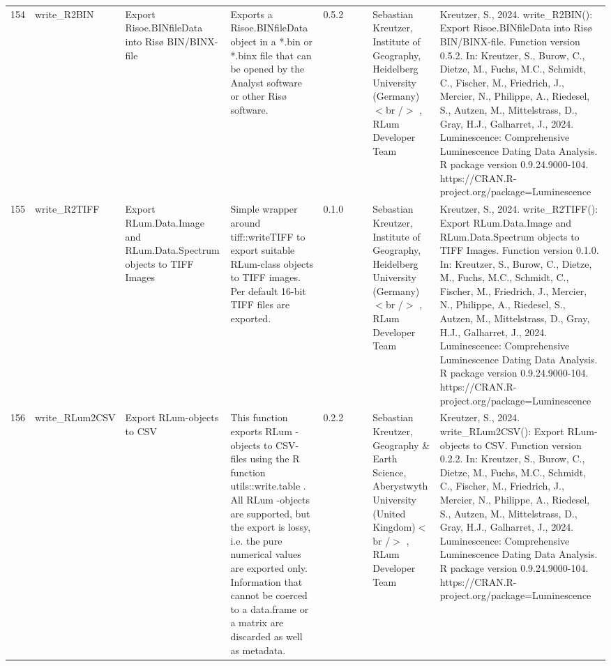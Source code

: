 \begin{table}[ht]
\begin{tabular}{rllllllll}
 \\ 
  154 & write\_R2BIN & Export Risoe.BINfileData into Risø BIN/BINX-file & Exports a  Risoe.BINfileData  object in a  *.bin  or  *.binx  file that can be opened by the Analyst software or other Risø software. & 0.5.2
 &  &  & Sebastian Kreutzer, Institute of Geography, Heidelberg University (Germany)$<$br /$>$ , RLum Developer Team & Kreutzer, S., 2024. write\_R2BIN(): Export Risoe.BINfileData into Risø BIN/BINX-file. Function version 0.5.2. In: Kreutzer, S., Burow, C., Dietze, M., Fuchs, M.C., Schmidt, C., Fischer, M., Friedrich, J., Mercier, N., Philippe, A., Riedesel, S., Autzen, M., Mittelstrass, D., Gray, H.J., Galharret, J., 2024. Luminescence: Comprehensive Luminescence Dating Data Analysis. R package version 0.9.24.9000-104. https://CRAN.R-project.org/package=Luminescence
 \\ 
  155 & write\_R2TIFF & Export RLum.Data.Image and RLum.Data.Spectrum objects to TIFF Images & Simple wrapper around  tiff::writeTIFF  to export suitable RLum-class objects to TIFF images. Per default 16-bit TIFF files are exported. & 0.1.0
 &  &  & Sebastian Kreutzer, Institute of Geography, Heidelberg University (Germany)$<$br /$>$ , RLum Developer Team & Kreutzer, S., 2024. write\_R2TIFF(): Export RLum.Data.Image and RLum.Data.Spectrum objects to TIFF Images. Function version 0.1.0. In: Kreutzer, S., Burow, C., Dietze, M., Fuchs, M.C., Schmidt, C., Fischer, M., Friedrich, J., Mercier, N., Philippe, A., Riedesel, S., Autzen, M., Mittelstrass, D., Gray, H.J., Galharret, J., 2024. Luminescence: Comprehensive Luminescence Dating Data Analysis. R package version 0.9.24.9000-104. https://CRAN.R-project.org/package=Luminescence
 \\ 
  156 & write\_RLum2CSV & Export RLum-objects to CSV & This function exports  RLum -objects to CSV-files using the R function utils::write.table . All  RLum -objects are supported, but the export is lossy, i.e. the pure numerical values are exported only. Information that cannot be coerced to a  data.frame  or a  matrix  are discarded as well as metadata. & 0.2.2
 &  &  & Sebastian Kreutzer, Geography \& Earth Science, Aberystwyth University (United Kingdom)$<$br /$>$ , RLum Developer Team & Kreutzer, S., 2024. write\_RLum2CSV(): Export RLum-objects to CSV. Function version 0.2.2. In: Kreutzer, S., Burow, C., Dietze, M., Fuchs, M.C., Schmidt, C., Fischer, M., Friedrich, J., Mercier, N., Philippe, A., Riedesel, S., Autzen, M., Mittelstrass, D., Gray, H.J., Galharret, J., 2024. Luminescence: Comprehensive Luminescence Dating Data Analysis. R package version 0.9.24.9000-104. https://CRAN.R-project.org/package=Luminescence
 \\ 
   \hline
\end{tabular}
\end{table}

